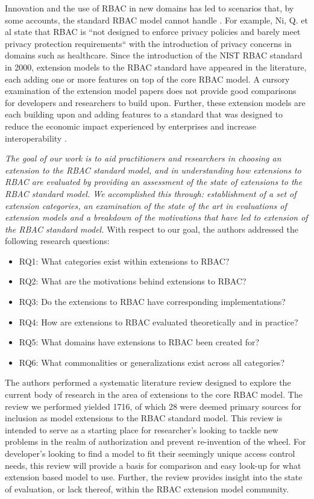 Innovation and the use of RBAC in new domains has led to scenarios that, by some accounts, the standard RBAC model cannot handle \cite{kuhn2010adding}.  
For example, Ni, Q. et al \cite{ni2010privacy} state that RBAC is ``not designed to enforce privacy policies and barely 
meet privacy protection requirements`` with the introduction of privacy concerns in domains such as healthcare. 
Since the introduction of the NIST RBAC standard in 2000, extension models to the RBAC standard have appeared in the literature, each adding one or more features on top of the core RBAC model. 
A cursory examination of the extension model papers does not provide good comparisons for developers and researchers to build upon. 
Further, these extension models are each building upon and adding features to a standard that was designed to reduce the economic impact experienced by enterprises and increase interoperability \cite{o20102010}.

\textit{The goal of our work is to aid practitioners and researchers in choosing an extension to the RBAC standard model, and in understanding
how extensions to RBAC are evaluated by providing an assessment of the state of extensions to the RBAC standard model. We accomplished this through: 
establishment of a set of extension categories, an examination of the state of the art in evaluations of extension models and a breakdown of the 
motivations that have led to extension of the RBAC standard model.} With respect to our goal, the authors addressed the following research questions:

\begin{itemize}
\setlength{\itemsep}{0.25pt}
\item RQ1: What categories exist within extensions to RBAC?
\item RQ2: What are the motivations behind extensions to RBAC?
\item RQ3: Do the extensions to RBAC have corresponding implementations?
\item RQ4: How are extensions to RBAC evaluated theoretically and in practice?
\item RQ5: What domains have extensions to RBAC been created for?
\item RQ6: What commonalities or generalizations exist across all categories?
\end{itemize}

The authors performed a systematic literature review designed to explore the current body of research in the area of extensions to the core RBAC model.  The review we performed yielded 1716, of which 28 were deemed primary sources for inclusion as model extensions to the RBAC standard model.  This review is intended to serve as a starting place for researcher's looking to tackle new problems in the realm of authorization and prevent re-invention of the wheel. For developer's looking to find a model to fit their seemingly unique access control needs, this review will provide a basis for comparison and easy look-up for what extension based model to use.  Further, the review provides insight into the state of evaluation, or lack thereof, within the RBAC extension model community.

